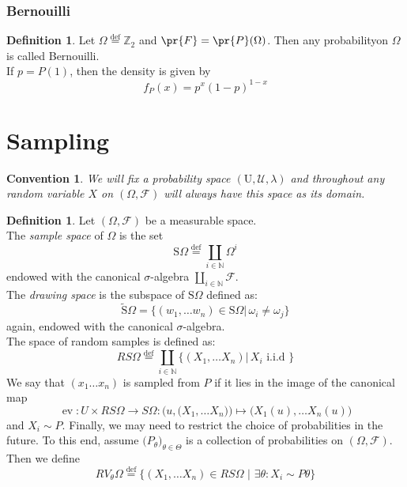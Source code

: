 \documentclass{book}
\theoremstyle{plain}
\newtheorem{convention}[corollary]{Convention}
\theoremstyle{definition}
\newtheorem{definition}[corollary]{Definition}
\renewcommand{\d}[1]{\mathbb{#1}}
\newcommand{\define}{\stackrel{\operatorname{def}}{=}}
\newcommand{\draw}[1]{\widetilde{\textrm{S}} #1}
\newcommand{\fun}{\mapsto}
\DeclareMathOperator{\ev}{ev}
\newcommand{\mor}{\longrightarrow}
\renewcommand{\r}[1]{\mathcal{#1}}
\newcommand{\sample}[1]{\textrm{S} #1}
\begin{document}
\subsubsection{Bernouilli}
\begin{definition}
Let $\Omega\define \d{Z}_2$ and $\pr{F}=\pr{P}(\Omega)$. Then any probabilityon $\Omega$ is called Bernouilli.\\
If $p=P(1)$, then the density is given by
\[
f_P(x) = p^x(1-p)^{1-x}
\]
\end{definition}

\section{Sampling}

\begin{convention}\label{conv:prob_univ}
We will fix a probability space $(\textrm{U}, \r{U},\lambda)$ and throughout any random variable $X$ on $(\Omega,\r{F})$ will always have this space as its domain.
\end{convention}

\begin{definition}\label{prob:def:sampling}
Let $(\Omega, \r{F})$ be a measurable space.\\
The \emph{sample space} of $\Omega$ is the set 
\[
\sample{\Omega}\define \coprod_{i \in \d{N}}\Omega^i
\]
endowed with the canonical $\sigma$-algebra $\coprod_{i \in \d{N}} \r{F}$.\\
The \emph{drawing space} is the subspace of $\sample{\Omega}$ defined as:
\[
\draw{\Omega} = \big\{ (w_1,\ldots w_n) \in \sample{\Omega} \vert \, \omega_i\neq \omega_j \big\}
\]
again, endowed with the canonical $\sigma$-algebra.\\
The space of random samples is defined as:
\[
RS\Omega\define  \coprod_{i \in \d{N}} \bigg\{(X_1,\ldots X_n)\vert \, X_i \textrm{ i.i.d }\}
\] 
We say that $(x_1\ldots x_n)$ is sampled from $P$ if it lies in the image of the canonical map
\[
\ev: U\times RS\Omega\mor S\Omega: \bigg(u, \big(X_1,\ldots X_n\big)\bigg)\fun \bigg(X_1(u),\ldots X_n(u)\bigg)
\]
and $X_i\sim P$.
Finally, we may need to restrict the choice of probabilities in the future. To this end, assume $\big(P_\theta\big)_{\theta \in \Theta}$ is a collection of probabilities on $(\Omega,\r{F})$. Then we define
\[
RV_\theta \Omega \define \bigg\{( X_1,\ldots X_n) \in RS\Omega\,\,\vert \,\, \exists \theta: X_i\sim P\theta \bigg\}
\]
\end{definition}
\end{document}
